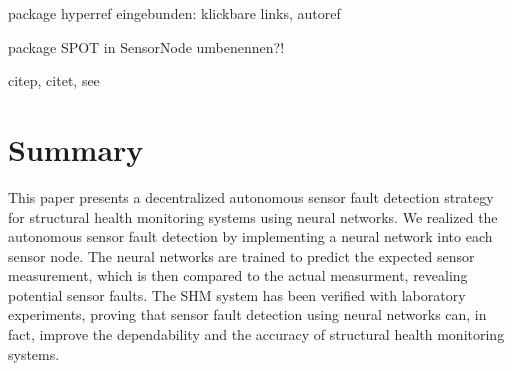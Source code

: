 \documentclass[12pt,a4paper]{scrartcl}
\begin{document}
	package hyperref eingebunden: klickbare links, autoref
	
	package SPOT in SensorNode umbenennen?!
	
	citep, citet, see
	
	\section*{Summary}
	
	This paper presents a decentralized autonomous sensor fault detection strategy for structural health monitoring systems using neural networks. 
	We realized the autonomous sensor fault detection by implementing a neural network into each sensor node.
	The neural networks are trained to predict the expected sensor measurement, which is then compared to the actual measurment, revealing potential sensor faults.
	The SHM system has been verified with laboratory experiments, proving that sensor fault detection using neural networks can, in fact, improve the dependability and the accuracy of structural health monitoring systems.
	
	
	
	
	
\end{document}
